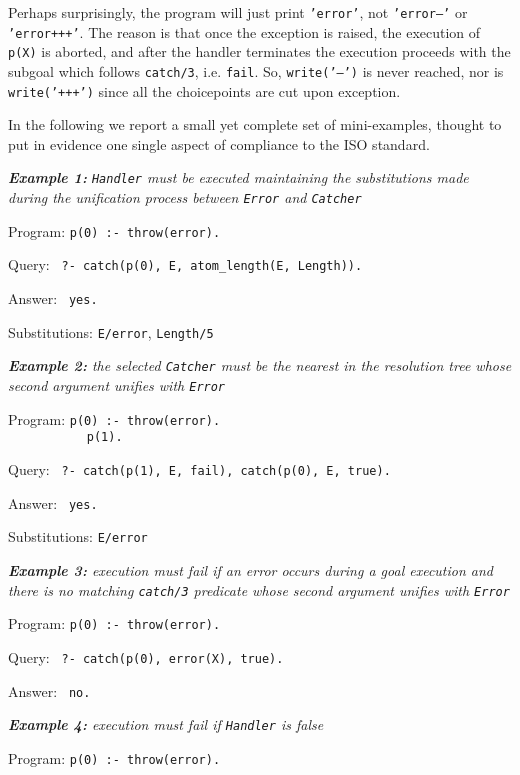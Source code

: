 Perhaps surprisingly, the program will just print \texttt{'error'}, not \texttt{'error---'} or
\texttt{'error+++'}. The reason is that once the exception is raised, the execution of
\texttt{p(X)} is aborted, and after the handler terminates the execution proceeds with the subgoal
which follows \texttt{catch/3}, i.e. \texttt{fail}. So, \texttt{write('---')} is never reached,
nor is \texttt{write('+++')} since all the choicepoints are cut upon exception.

\smallskip
In the following we report a small yet complete set of mini-examples, thought to put in
evidence one single aspect of \tuprolog{} compliance to the ISO standard.

\medskip
\textit{\textbf{Example 1:} \texttt{Handler} must be executed maintaining the substitutions
made during the unification process between \texttt{Error} and \texttt{Catcher}}

Program: \texttt{p(0) :- throw(error).}

Query: \texttt{ ?- catch(p(0), E, atom\_length(E, Length)).}

Answer: \texttt{ yes.}

Substitutions: \texttt{E/error}, \texttt{Length/5}

\medskip
\textit{\textbf{Example 2:} the selected \texttt{Catcher} must be the nearest in the resolution
tree whose second argument unifies with \texttt{Error}}

Program: \texttt{p(0) :- throw(error).}\\
\mbox{\texttt{~~~~~~~~~~~}}\texttt{p(1).}

Query: \texttt{ ?- catch(p(1), E, fail),  catch(p(0), E, true).}

Answer: \texttt{ yes.}

Substitutions: \texttt{E/error}

\medskip
\textit{\textbf{Example 3:} execution must fail if an error occurs during a goal execution and
there is no matching \texttt{catch/3} predicate whose second argument unifies with \texttt{Error}}

Program: \texttt{p(0) :- throw(error).}

Query: \texttt{ ?- catch(p(0), error(X), true).}

Answer: \texttt{ no.}

\medskip
\textit{\textbf{Example 4:} execution must fail if \texttt{Handler} is false}

Program: \texttt{p(0) :- throw(error).}

